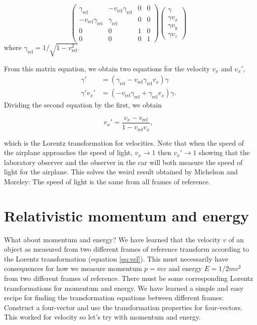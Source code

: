 {\begin{multicols}{2}
\begin{formbox}
\[\begin{pmatrix}
\gamma_\mathrm{rel}&-v_\mathrm{rel}\gamma_\mathrm{rel}&0&0\\
-v_\mathrm{rel}\gamma_\mathrm{rel}&\gamma_\mathrm{rel}&0&0\\
0&0&1&0\\
0&0&0&1
\end{pmatrix}
\begin{pmatrix}
\gamma\\
\gamma v_x\\
\gamma v_y\\
\gamma v_z
\end{pmatrix}
\]
where $\gamma_\mathrm{rel}=1/\sqrt{1-v_\mathrm{rel}^2}$.
\end{formbox}
From this matrix equation, we obtain two equations for the velocity $v_x$ and $v_x'$,
\begin{align*}
\gamma'&=(\gamma_\mathrm{rel}-v_\mathrm{rel}\gamma_\mathrm{rel}v_x)\gamma\\
\gamma'v_x'&=(-v_\mathrm{rel}\gamma_\mathrm{rel}+\gamma_\mathrm{rel}v_x)\gamma.
\end{align*}
Dividing the second equation by the first, we obtain
\begin{formbox}
\begin{equation}
\label{eq:vel}
v_x'=\frac{v_x-v_\mathrm{rel}}{1-v_\mathrm{rel}v_x},
\end{equation}
\end{formbox}
which is the Lorentz transformation for velocities. Note that when the speed of the airplane approaches the speed of light, $v_x\rightarrow1$ then $v_x'\rightarrow1$ showing that the laboratory observer and the observer in the car will both measure the speed of light for the airplane. This solves the weird result obtained by Michelson and Moreley: The speed of light is the same from all frames of reference.

\section{Relativistic momentum and energy}
\label{sect:energy}

What about momentum and energy? We have learned that the velocity $v$ of an object as measured from two different frames of reference transform according to the Lorentz transformation (equation \ref{eq:vel}). This must necessarily have consequences for how we measure momentum $p=mv$ and energy $E=1/2mv^2$ from two different frames of reference. There must be some corresponding Lorentz transformations for momentum and energy. We have learned a simple and easy recipe for finding the transformation equations between different frames: Construct a four-vector and use the transformation properties for four-vectors. This worked for velocity so let's try with momentum and energy.


\end{multicols}}
